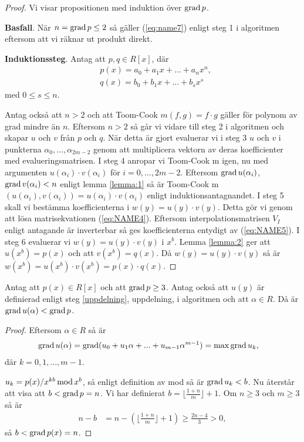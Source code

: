 \begin{proof}
Vi visar propositionen med induktion över $\operatorname*{grad} p$.

\noindent\textbf{Basfall}. När $n = \operatorname*{grad} p \leq 2$ så gäller (\ref{eq:name7})
enligt steg 1 i algoritmen eftersom att vi räknar ut produkt direkt.

\bigskip\noindent
\textbf{Induktionssteg}. Antag att $p, q \in R[x]$, där
\begin{align*}
  &p(x) = a_0 + a_1 x + ... + a_n x^n, \\
  &q(x) = b_0 + b_1 x + ... + b_s x^s
\end{align*}
med $0 \leq s \leq n$.

\bigskip\noindent
Antag också att $n > 2$ och att Toom-Cook $m (f, g) =  f \cdot g$ gäller för
polynom av grad mindre än $n$. Eftersom $n > 2$ så går vi vidare till steg 2 i
algoritmen och skapar $u$ och $v$ från $p$ och $q$. När detta är gjort
evaluerar vi i steg 3 $u$ och $v$ i punkterna $\alpha_0, ...,  \alpha_{2m-2}$
genom att multiplicera vektorn av deras koefficienter med evalueringsmatrisen.
I steg 4 anropar vi Toom-Cook m  igen, nu med argumenten $u(\alpha_i) \cdot
v(\alpha_i)$ för $i = 0, \ldots , 2m-2$. Eftersom $\operatorname*{grad} u(\alpha_i)$, $\operatorname*{grad}
v(\alpha_i) < n$ enligt lemma \ref{lemma:1} så är Toom-Cook m $(u(\alpha_i),
v(\alpha_i)) = u(\alpha_i) \cdot v(\alpha_i)$ enligt induktionsantagnandet. I
steg 5 skall vi bestämma koefficienterna i $w(y)=u(y) \cdot v(y)$. Detta gör vi
genom att lösa matrisekvationen (\ref{eq:NAME4}). Eftersom
interpolationsmatrisen $V_I$ enligt antagande är inverterbar så ges
koefficienterna entydigt av (\ref{eq:NAME5}). I steg 6 evaluerar vi $w(y)=u(y)
\cdot v(y)$ i $x^b$. Lemma \ref{lemma:2} ger att $u(x^b)=p(x)$ och att
$v(x^b)=q(x)$. Då $w(y)=u(y) \cdot v(y)$ så är $w(x^b)=u(x^b) \cdot v(x^b)=p(x)
\cdot q(x)$.
\end{proof}

\begin{lemma}
  \label{lemma:1}
  Antag att $p(x) \in R[x]$ och att $\operatorname*{grad} p \geq 3$. Antag också att $u(y)$ är
  definierad enligt steg \ref{uppdelning}, uppdelning, i algoritmen och att
  $\alpha \in R$. Då är $\operatorname*{grad} u(\alpha) < \operatorname*{grad} p$.
\end{lemma}
\begin{proof}
  Eftersom $\alpha \in R$ så är
  \begin{align*}
    \operatorname*{grad} u(\alpha) &= \operatorname*{grad} (u_0 + u_1 \alpha + ... + u_{m-1}\alpha^{m-1}) = \max \operatorname*{grad} u_k,
  \end{align*}
  där $k={0,1,...,m-1}$.

  \bigskip\noindent
  $u_k = p(x)/x^{k b} \operatorname*{mod} x^b$, så enligt definition av mod så är $\operatorname*{grad} u_k
  < b$. Nu återstår att visa att $b < \operatorname*{grad} p = n$. Vi har definierat $b =
  \lfloor \frac{1 + n}{m}\rfloor + 1$. Om $n \geq 3$ och $m \geq 3$ så är
  \begin{align*}
    n-b &= n-(\lfloor \frac{1 + n}{m}\rfloor + 1) \geq \frac{2n-4}{3} > 0,
  \end{align*}
  så $b < \operatorname*{grad} p(x) = n$.
\end{proof}

